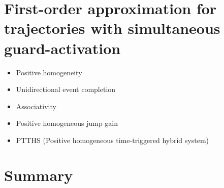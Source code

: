 \documentclass[../DC2017114Bouma.tex]{subfiles}
\begin{document}
\section{First-order approximation for trajectories with simultaneous guard-activation}
\begin{itemize}
\item Positive homogeneity
\item Unidirectional event completion
\item Associativity
\item Positive homogeneous jump gain
\item PTTHS (Positive homogeneous time-triggered hybrid system)
\end{itemize}
%
%
%
%
%
%

\section{Summary}
\end{document}
